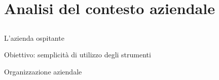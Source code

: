 \section{Analisi del contesto aziendale}
	\subsection{}
		\begin{frame}{L'azienda ospitante}
		\end{frame}
		\begin{frame}{Obiettivo: semplicità di utilizzo degli strumenti}
		\end{frame}
		\begin{frame}{Organizzazione aziendale}
		\end{frame}
